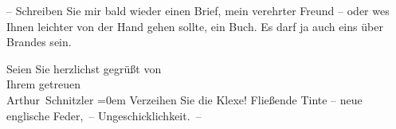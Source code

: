 \pstart
           {\pb}– Schreiben Sie mir bald wieder einen Brief, mein
               verehrter Freund – oder we{\geminationn}s Ihnen leichter von der Hand
               gehen sollte, ein Buch. Es darf ja auch eins über Brandes sein.\pend
           
\pstart
           Seien Sie herzlichst gegrüßt von{\\[\baselineskip]}Ihrem getreuen{\\[\baselineskip]}\spacefill\mbox{Arthur Schnitzler}\pend
           \leftskip=0em{}
\pstart
           \noindent{}Verzeihen Sie die Klexe! Fließende Tinte – neue englische Feder, – Ungeschicklichkeit. –\pend
           \endnumbering{}  
      